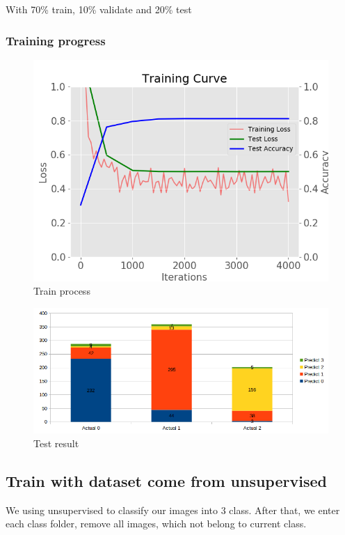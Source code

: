 \documentclass[11pt]{article}
\begin{document}
With 70\% train, 10\% validate and 20\% test

\subsubsection{Training progress}

\begin{figure}[H]
\centering
\includegraphics[width=1\textwidth]{images/70_10_20_train_large_dataset}
\caption{Train process}
\end{figure}

\begin{figure}[H]
\centering
\includegraphics[width=1\textwidth]{images/70_10_20_result_large_dataset}
\caption{Test result}
\end{figure}
\subsection{Train with dataset come from unsupervised}
We using unsupervised to classify our images into 3 class. After that, we enter each class folder, remove all images, which not belong to current class. 
\end{document}
